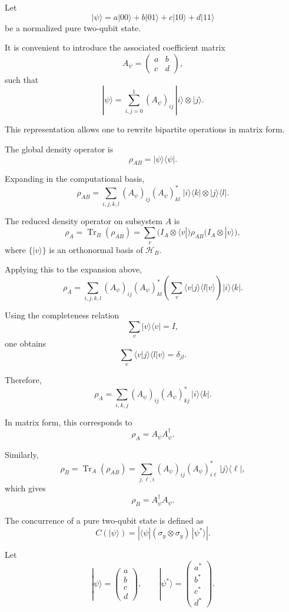 \documentclass[a4paper]{article}
\begin{document}
Let
\[
|\psi\rangle
=
a|00\rangle + b|01\rangle + c|10\rangle + d|11\rangle
\]
be a normalized pure two-qubit state.

It is convenient to introduce the associated coefficient matrix
\[
A_\psi =
\begin{pmatrix}
a & b\\
c & d
\end{pmatrix},
\]
such that
\[
|\psi\rangle
=
\sum_{i,j=0}^{1} (A_\psi)_{ij}\,|i\rangle \otimes |j\rangle.
\]

This representation allows one to rewrite bipartite operations in matrix form.

The global density operator is
\[
\rho_{AB} = |\psi\rangle\langle\psi|.
\]

Expanding in the computational basis,
\[
\rho_{AB}
=
\sum_{i,j,k,l}
(A_\psi)_{ij}(A_\psi)^*_{kl}
\;
|i\rangle\langle k|
\otimes
|j\rangle\langle l|.
\]

The reduced density operator on subsystem \(A\) is
\[
\rho_A = \operatorname{Tr}_B(\rho_{AB})
=
\sum_v
\bigl(I_A \otimes \langle v|\bigr)
\rho_{AB}
\bigl(I_A \otimes |v\rangle\bigr),
\]
where \(\{|v\rangle\}\) is an orthonormal basis of \(\mathcal{H}_B\).

Applying this to the expansion above,
\[
\rho_A
=
\sum_{i,j,k,l}
(A_\psi)_{ij}(A_\psi)^*_{kl}
\left(
\sum_v \langle v|j\rangle \langle l|v\rangle
\right)
|i\rangle\langle k|.
\]

Using the completeness relation
\[
\sum_v |v\rangle\langle v| = I,
\]
one obtains
\[
\sum_v \langle v|j\rangle \langle l|v\rangle = \delta_{jl}.
\]

Therefore,
\[
\rho_A
=
\sum_{i,k,j}
(A_\psi)_{ij}(A_\psi)^*_{kj}
\,|i\rangle\langle k|.
\]

In matrix form, this corresponds to
\[
\rho_A = A_\psi A_\psi^\dagger.
\]

Similarly,
\[
\rho_B = \operatorname{Tr}_A(\rho_{AB})
=
\sum_{j,\ell,i}
(A_\psi)_{ij}(A_\psi)^*_{i\ell}
\,|j\rangle\langle \ell|,
\]
which gives
\[
\rho_B = A_\psi^\dagger A_\psi.
\]


The concurrence of a pure two-qubit state is defined as
\[
C(|\psi\rangle)
=
\left|
\langle \psi | (\sigma_y \otimes \sigma_y)\,|\psi^*\rangle
\right|.
\]

Let
\[
|\psi\rangle =
\begin{pmatrix}
a\\
b\\
c\\
d
\end{pmatrix},
\qquad
|\psi^*\rangle =
\begin{pmatrix}
a^*\\
b^*\\
c^*\\
d^*
\end{pmatrix}.
\]
\end{document}
